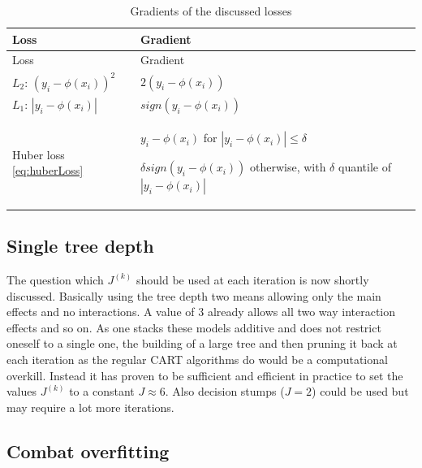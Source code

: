 \documentclass[
]{book}
\begin{document}
\begin{longtable}[]{@{}
  >{\raggedright\arraybackslash}p{}
  >{\raggedright\arraybackslash}p{}@{}}
\caption{\label{tab:lossGradients} Gradients of the discussed losses \citep{elements}}\tabularnewline
\toprule
Loss & Gradient \\
\midrule
\endfirsthead
\toprule
Loss & Gradient \\
\midrule
\endhead
\(L_2\): \((y_i - \phi(x_i))^2\) & \(2(y_i - \phi(x_i))\) \\
\(L_1\): \(|y_i - \phi(x_i)|\) & \(sign(y_i - \phi(x_i))\) \\
Huber loss \eqref{eq:huberLoss} & \(y_i - \phi(x_i)\) for \(|y_i - \phi(x_i)| \leq \delta\)

\(\delta sign(y_i - \phi(x_i))\) otherwise, with \(\delta\) quantile of \(|y_i - \phi(x_i)|\) \\
\bottomrule
\end{longtable}

\hypertarget{single-tree-depth}{%
\subsection{Single tree depth}\label{single-tree-depth}}

The question which \(J^{(k)}\) should be used at each iteration is now shortly discussed. Basically using the tree depth two means allowing only the main effects and no interactions. A value of 3 already allows all two way interaction effects and so on. As one stacks these models additive and does not restrict oneself to a single one, the building of a large tree and then pruning it back at each iteration as the regular CART algorithms do would be a computational overkill. Instead it has proven to be sufficient and efficient in practice to set the values \(J^{(k)}\) to a constant \(J \approx 6\).\citep{elements} Also decision stumps (\(J = 2\)) could be used but may require a lot more iterations.

\hypertarget{combOver}{%
\subsection{Combat overfitting}\label{combOver}}
\end{document}
